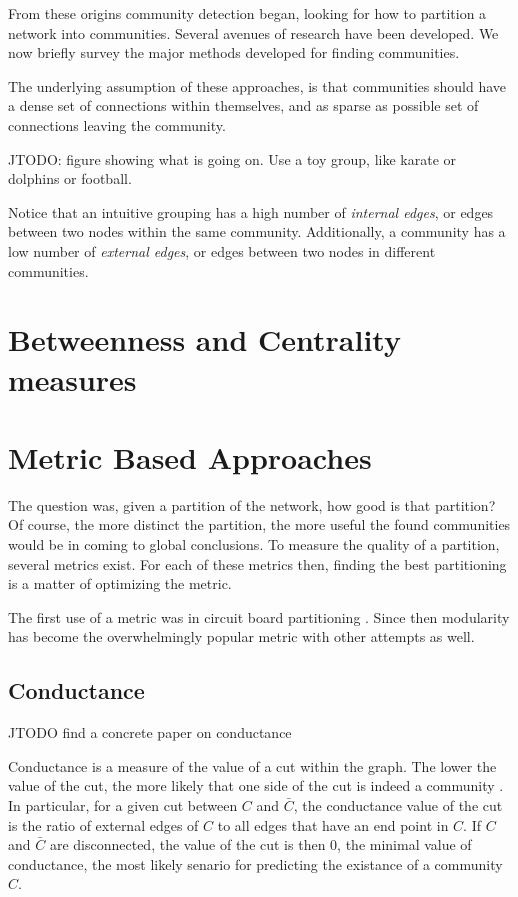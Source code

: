 \documentclass[phd,tocprelim]{cornell}
\begin{document}
From these origins community detection began, looking for how to partition a network into communities.  Several avenues of research have been developed.  We now briefly survey the major methods developed for finding communities.

The underlying assumption of these approaches, is that communities should have a dense set of connections within themselves, and as sparse as possible set of connections leaving the community.

JTODO: figure showing what is going on.  Use a toy group, like karate or dolphins or football.

Notice that an intuitive grouping has a high number of {\it internal edges}, or edges between two nodes within the same community.  Additionally, a community has a low number of {\it external edges}, or edges between two nodes in different communities.

\section{Betweenness and Centrality measures}

\section{Metric Based Approaches}

The question was, given a partition of the network, how good is that partition?  Of course, the more distinct the partition, the more useful the found communities would be in coming to global conclusions.  To measure the quality of a partition, several metrics exist.  For each of these metrics then, finding the best partitioning is a matter of optimizing the metric.

The first use of a metric was in circuit board partitioning \cite{}.  Since then modularity has become the overwhelmingly popular metric with other attempts as well.

\subsection{Conductance}

JTODO find a concrete paper on conductance

Conductance is a measure of the value of a cut within the graph.  The lower the value of the cut, the more likely that one side of the cut is indeed a community \cite{}.  In particular, for a given cut between $C$ and $\bar{C}$, the conductance value of the cut is the ratio of external edges of $C$ to all edges that have an end point in $C$.  If $C$ and $\bar{C}$ are disconnected, the value of the cut is then $0$, the minimal value of conductance, the most likely senario for predicting the existance of a community $C$.
\end{document}
